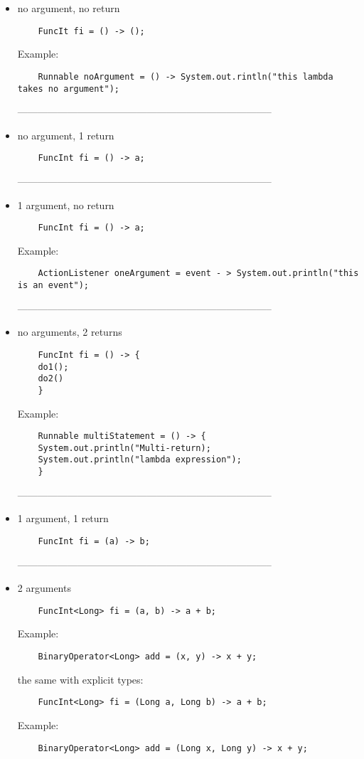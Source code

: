\documentclass{report}
\begin{document}
\begin{itemize}
	\item no argument, no return
	\begin{verbatim}
	FuncIt fi = () -> ();
	\end{verbatim}
	
	Example:
	\begin{verbatim}
	Runnable noArgument = () -> System.out.rintln("this lambda takes no argument");
	\end{verbatim}
	-----------------------------------------------------------------------------
	\item no argument, 1 return
	\begin{verbatim}
	FuncInt fi = () -> a;
	\end{verbatim}
	-----------------------------------------------------------------------------
	
	\item 1 argument, no return
	\begin{verbatim}
	FuncInt fi = () -> a;	
	\end{verbatim}
	Example:
	\begin{verbatim}
	ActionListener oneArgument = event - > System.out.println("this is an event"); 
	\end{verbatim}
	-----------------------------------------------------------------------------
	
	\item no arguments, 2 returns
	\begin{verbatim}
	FuncInt fi = () -> {
	do1();
	do2()
	}
	\end{verbatim}
	Example:
	\begin{verbatim}
	Runnable multiStatement = () -> {
	System.out.println("Multi-return);
	System.out.println("lambda expression");
	}
	\end{verbatim}
	-----------------------------------------------------------------------------
	
	\item 1 argument, 1 return
	\begin{verbatim}
	FuncInt fi = (a) -> b;
	\end{verbatim}
	-----------------------------------------------------------------------------
	\item 2 arguments
	\begin{verbatim}
	FuncInt<Long> fi = (a, b) -> a + b;
	\end{verbatim}
	Example:
	\begin{verbatim}
	BinaryOperator<Long> add = (x, y) -> x + y;
	\end{verbatim}
	
	the same with explicit types:
	\begin{verbatim}
	FuncInt<Long> fi = (Long a, Long b) -> a + b;
	\end{verbatim}
	Example:
	\begin{verbatim}
	BinaryOperator<Long> add = (Long x, Long y) -> x + y;
	\end{verbatim}
\end{itemize}
\end{document}
